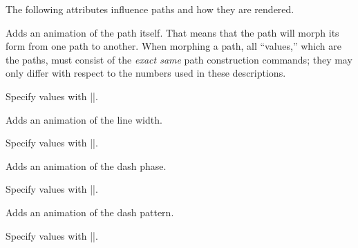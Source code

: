 The following attributes influence paths and how they are rendered.

\begin{command}{\pgfsys@animatepath}
  Adds an animation of the path itself. That means that the path will
  morph its form from one path to another. When morphing a path, all
  ``values,'' which are the paths, must consist of the  \emph{exact
    same} path construction commands; they may only differ with
  respect to the numbers used in these descriptions.
  
  Specify values with |\pgfsys@animation@val@path|.
\begin{codeexample}[width=3.3cm]
\end{codeexample}
\end{command}

\begin{command}{\pgfsys@animatelinewidth}
  Adds an animation of the line width.
  
  Specify values with |\pgfsys@animation@val@dimension|.
\begin{codeexample}[width=2cm]
\end{codeexample}
\end{command}

\begin{command}{\pgfsys@animatedashphase}
  Adds an animation of the dash phase.
  
  Specify values with |\pgfsys@animation@val@dimension|.
\begin{codeexample}[width=2cm]
\end{codeexample}
\end{command}

\begin{command}{\pgfsys@animatedashpattern}
  Adds an animation of the dash pattern.
  
  Specify values with |\pgfsys@animation@val@dashpattern|.
\begin{codeexample}[width=2cm]
\end{codeexample}
\end{command}


